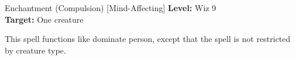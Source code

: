 {Enchantment (Compulsion) [Mind-Affecting]}
{
	\textbf{Level:}
	Wiz 9\\
	\textbf{Target:}
	One creature\\
}
{
	This spell functions like dominate person, except that the spell is not restricted by creature type.

}
